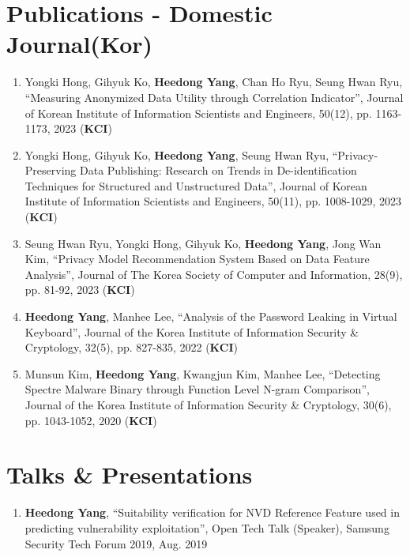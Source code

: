\documentclass[letterpaper,11pt]{article}
\newcommand{\resumeItem}[1]{
  \item\small{
    {#1 \vspace{-2pt}}
  }
}
\newcommand{\paperListStart}{\begin{enumerate}}
\newcommand{\paperListEnd}{\end{enumerate}\vspace{-5pt}}
\begin{document}

\section{Publications - Domestic Journal(Kor)}
  \vspace{3pt}
  \paperListStart
    \resumeItem
    {Yongki Hong, Gihyuk Ko, \textbf{Heedong Yang}, Chan Ho Ryu, Seung Hwan Ryu, “Measuring Anonymized Data Utility through Correlation Indicator”, Journal of Korean Institute of Information Scientists and Engineers, 50(12), pp. 1163-1173, 2023 (\textbf{KCI})}

    \resumeItem
    {Yongki Hong, Gihyuk Ko, \textbf{Heedong Yang}, Seung Hwan Ryu, “Privacy-Preserving Data Publishing: Research on Trends in De-identification Techniques for Structured and Unstructured Data”, Journal of Korean Institute of Information Scientists and Engineers, 50(11), pp. 1008-1029, 2023 (\textbf{KCI})}

    \resumeItem
      {Seung Hwan Ryu, Yongki Hong, Gihyuk Ko, \textbf{Heedong Yang}, Jong Wan Kim, “Privacy Model Recommendation System Based on Data Feature Analysis”, Journal of The Korea Society of Computer and Information, 28(9), pp. 81-92, 2023 (\textbf{KCI})}

    \resumeItem
      {\textbf{Heedong Yang}, Manhee Lee, “Analysis of the Password Leaking in Virtual Keyboard”, Journal of the Korea Institute of Information Security \& Cryptology, 32(5), pp. 827-835, 2022 (\textbf{KCI})}

    \resumeItem
      {Munsun Kim, \textbf{Heedong Yang}, Kwangjun Kim, Manhee Lee, “Detecting Spectre Malware Binary through Function Level N-gram Comparison”, Journal of the Korea Institute of Information Security \& Cryptology, 30(6), pp. 1043-1052, 2020 (\textbf{KCI})}

  \paperListEnd



\section{Talks \& Presentations}
\vspace{3pt}
\paperListStart
  \resumeItem
    {\textbf{Heedong Yang}, “Suitability verification for NVD Reference Feature used in predicting vulnerability exploitation”, Open Tech Talk (Speaker), Samsung Security Tech Forum 2019, Aug. 2019}
 \paperListEnd

\end{document}
